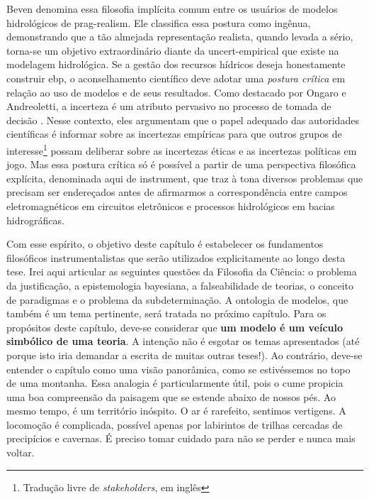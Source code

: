 \documentclass[./main.tex]{subfiles}
\begin{document}
\par Beven denomina essa filosofia implícita comum entre os usuários de modelos hidrológicos de \gls{prag-realism}. Ele classifica essa postura como ingênua, demonstrando que a tão almejada representação realista, quando levada a sério, torna-se um objetivo extraordinário diante da \gls{uncert-empirical} que existe na modelagem hidrológica. Se a gestão dos recursos hídricos deseja honestamente construir \gls{ebp}, o aconselhamento científico deve adotar uma \textit{postura crítica} em relação ao uso de modelos e de seus resultados. Como destacado por Ongaro e Andreoletti, a incerteza é um atributo pervasivo no processo de tomada de decisão \cite{Ongaro2022}. Nesse contexto, eles argumentam que o papel adequado das autoridades científicas é informar sobre as incertezas empíricas para que outros grupos de interesse\footnote{Tradução livre de \textit{stakeholders}, em inglês} possam deliberar sobre as incertezas éticas e as incertezas políticas em jogo. Mas essa postura crítica só é possível a partir de uma perspectiva filosófica explícita, denominada aqui de \gls{instrument}, que traz à tona diversos problemas que precisam ser endereçados antes de afirmarmos a correspondência entre campos eletromagnéticos em circuitos eletrônicos e processos hidrológicos em bacias hidrográficas. 

\par Com esse espírito, o objetivo deste capítulo é estabelecer os fundamentos filosóficos instrumentalistas que serão utilizados explicitamente ao longo desta tese. Irei aqui articular as seguintes questões da Filosofia da Ciência: o problema da justificação, a epistemologia bayesiana, a falseabilidade de teorias, o conceito de paradigmas e o problema da subdeterminação. A ontologia de modelos, que também é um tema pertinente, será tratada no próximo capítulo. Para os propósitos deste capítulo, deve-se considerar que \textbf{um modelo é um veículo simbólico de uma teoria}. A intenção não é esgotar os temas apresentados (até porque isto iria demandar a escrita de muitas outras teses!). Ao contrário, deve-se entender o capítulo como uma visão panorâmica, como se estivéssemos no topo de uma montanha. Essa analogia é particularmente útil, pois o cume propicia uma boa compreensão da paisagem que se estende abaixo de nossos pés. Ao mesmo tempo, é um território inóspito. O ar é rarefeito, sentimos vertigens. A locomoção é complicada, possível apenas por labirintos de trilhas cercadas de precipícios e cavernas. É preciso tomar cuidado para não se perder e nunca mais voltar.
\end{document}

